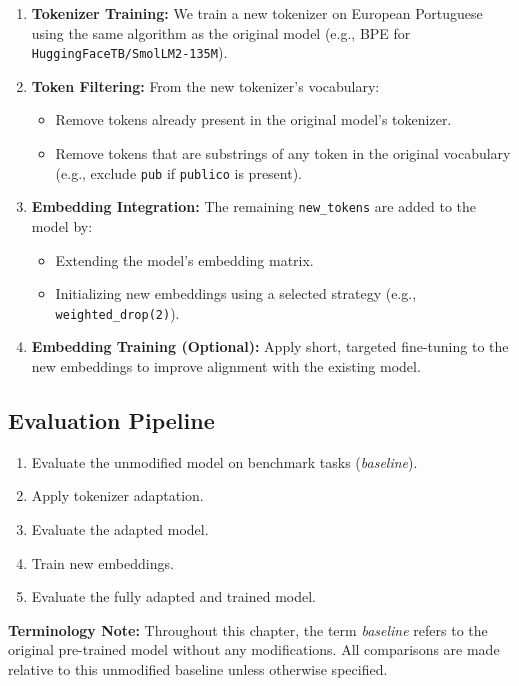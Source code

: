 \begin{enumerate}
    \item \textbf{Tokenizer Training:} We train a new tokenizer on European Portuguese using the same algorithm as the original model (e.g., BPE for \texttt{HuggingFaceTB/SmolLM2-135M}).
    \item \textbf{Token Filtering:} From the new tokenizer’s vocabulary:
    \begin{itemize}
        \item Remove tokens already present in the original model’s tokenizer.
        \item Remove tokens that are substrings of any token in the original vocabulary (e.g., exclude \texttt{pub} if \texttt{publico} is present).
    \end{itemize}
    \item \textbf{Embedding Integration:} The remaining \texttt{new\_tokens} are added to the model by:
    \begin{itemize}
        \item Extending the model's embedding matrix.
        \item Initializing new embeddings using a selected strategy (e.g., \texttt{weighted\_drop(2)}).
    \end{itemize}
    \item \textbf{Embedding Training (Optional):} Apply short, targeted fine-tuning to the new embeddings to improve alignment with the existing model.
\end{enumerate}

\subsection*{\textbf{Evaluation Pipeline}}

\begin{enumerate}
    \item Evaluate the unmodified model on benchmark tasks (\textit{baseline}).
    \item Apply tokenizer adaptation.
    \item Evaluate the adapted model.
    \item Train new embeddings.
    \item Evaluate the fully adapted and trained model.
\end{enumerate}

\textbf{Terminology Note: }Throughout this chapter, the term \textit{baseline} refers to the original pre-trained model without any modifications. All comparisons are made relative to this unmodified baseline unless otherwise specified.

